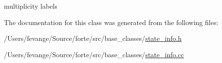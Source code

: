 multiplicity labels 



The documentation for this class was generated from the following files\+:\begin{DoxyCompactItemize}
\item 
/\+Users/fevange/\+Source/forte/src/base\+\_\+classes/\mbox{\hyperlink{state__info_8h}{state\+\_\+info.\+h}}\item 
/\+Users/fevange/\+Source/forte/src/base\+\_\+classes/\mbox{\hyperlink{state__info_8cc}{state\+\_\+info.\+cc}}\end{DoxyCompactItemize}
